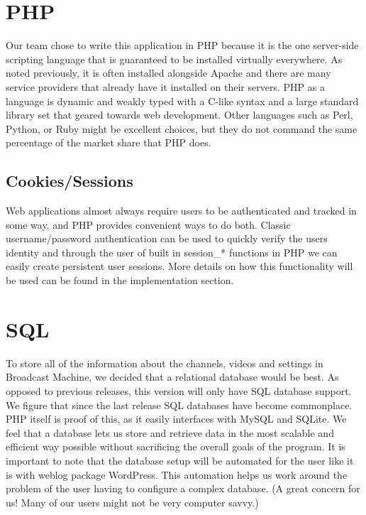 \documentclass[a4paper,12pt]{report}
\begin{document}
\section{PHP}
Our team chose to write this application in PHP because it is the one server-side scripting language that is guaranteed to be installed virtually everywhere.
As noted previously, it is often installed alongside Apache and there are many service providers that already have it installed on their servers.
PHP as a language is dynamic and weakly typed with a C-like syntax and a large standard library set that geared towards web development.
Other languages such as Perl, Python, or Ruby might be excellent choices, but they do not command the same percentage of the market share that PHP does.


\subsection{Cookies/Sessions}
Web applications almost always require users to be authenticated and tracked in some way, and PHP provides convenient ways to do both.
Classic username/password authentication can be used to quickly verify the users identity and through the user of built in session\_* functions in PHP we can easily create persistent user sessions.
More details on how this functionality will be used can be found in the implementation section.


\section{SQL}
To store all of the information about the channels, videos and settings in Broadcast Machine, we decided that a relational database would be best. 
As opposed to previous releases, this version will only have SQL database support.
We figure that since the last release SQL databases have become commonplace.
PHP itself is proof of this, as it easily interfaces with MySQL and SQLite.
We feel that a database lets us store and retrieve data in the most scalable and efficient way possible without sacrificing the overall goals of the program.
It is important to note that the database setup will be automated for the user like it is with weblog package WordPress.
This automation helps us work around the problem of the user having to configure a complex database. (A great concern for us! Many of our users might not be very computer savvy.)
\end{document}
